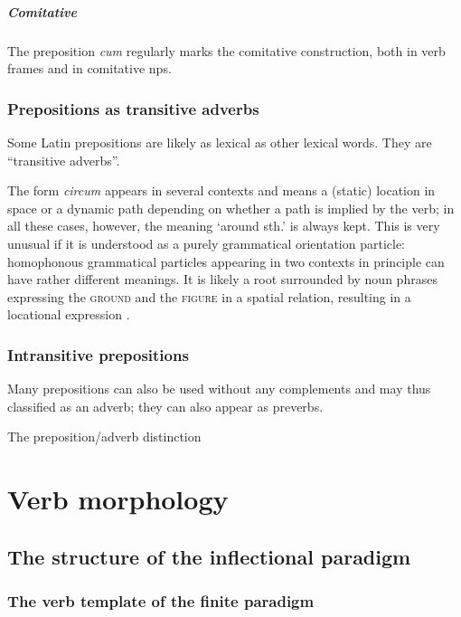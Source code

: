 \documentclass[a4paper, oneside, 12pt]{report}
\newcommand{\form}[1]{\emph{#1}}
\newcommand*{\category}[1]{\textsc{#1}}
\newcommand{\translate}[1]{`#1'}
\begin{document}
\paragraph*{Comitative}
\label{sec:modifiy.prep.grammar.comitative}
The preposition \form{cum} regularly marks the comitative construction,
both in verb frames and in comitative \acp{np}.

\subsection{Prepositions as transitive adverbs}

Some Latin prepositions are likely as lexical as other lexical words.
They are ``transitive adverbs''.

The form \form{circum} appears in several contexts
and means a (static) location in space or a dynamic path 
depending on whether a path is implied by the verb;
in all these cases, however, the meaning \translate{around sth.} is always kept.
This is very unusual if it is understood as a purely grammatical orientation particle:
homophonous grammatical particles appearing in two contexts in principle can have rather different meanings.
It is likely a root surrounded by noun phrases expressing the \category{ground} and the \category{figure} 
in a spatial relation,
resulting in a locational expression \citet{mare2018issues}.

\subsection{Intransitive prepositions}

Many prepositions can also be used without any complements 
and may thus classified as an adverb; 
they can also appear as preverbs.

The preposition/adverb distinction

\chapter{Verb morphology}\label{chap:verb}

\section{The structure of the inflectional paradigm}

\subsection{The verb template of the finite paradigm}\label{sec:verb.finite.paradigm}
\end{document}
